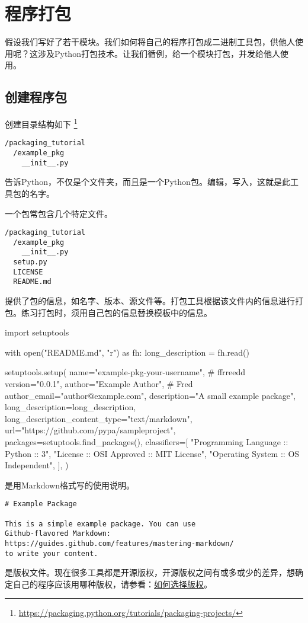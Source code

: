 \section{程序打包}
假设我们写好了若干模块。我们如何将自己的程序打包成二进制工具包，供他人使用呢？这涉及Python打包技术。让我们循例，给一个模块打包，并发给他人使用。
\subsection{创建程序包}
创建目录结构如下
\footnote{\url{https://packaging.python.org/tutorials/packaging-projects/}}
\begin{framed}
\begin{verbatim}
/packaging_tutorial
  /example_pkg
    __init__.py
\end{verbatim}
\end{framed}
告诉Python，不仅是个文件夹，而且是一个Python包。编辑，写入，这就是此工具包的名字。

一个包常包含几个特定文件。
\begin{framed}
\begin{verbatim}
/packaging_tutorial
  /example_pkg
    __init__.py
  setup.py
  LICENSE
  README.md
\end{verbatim}
\end{framed}
提供了包的信息，如名字、版本、源文件等。打包工具根据该文件内的信息进行打包。练习打包时，须用自己包的信息替换模板中的信息。
\begin{python}
import setuptools

with open("README.md", "r") as fh:
    long_description = fh.read()

setuptools.setup(
    name="example-pkg-your-username", # ffrreedd
    version="0.0.1",
    author="Example Author", # Fred
    author_email="author@example.com",
    description="A small example package",
    long_description=long_description,
    long_description_content_type="text/markdown",
    url="https://github.com/pypa/sampleproject",
    packages=setuptools.find_packages(),
    classifiers=[
        "Programming Language :: Python :: 3",
        "License :: OSI Approved :: MIT License",
        "Operating System :: OS Independent",
    ],
)
\end{python}
是用Markdown格式写的使用说明。
\begin{framed}
\begin{verbatim}
# Example Package

This is a simple example package. You can use
Github-flavored Markdown:
https://guides.github.com/features/mastering-markdown/
to write your content.
\end{verbatim}
\end{framed}
是版权文件。现在很多工具都是开源版权，开源版权之间有或多或少的差异，想确定自己的程序应该用哪种版权，请参看：\href{https://choosealicense.com/}{如何选择版权}。
